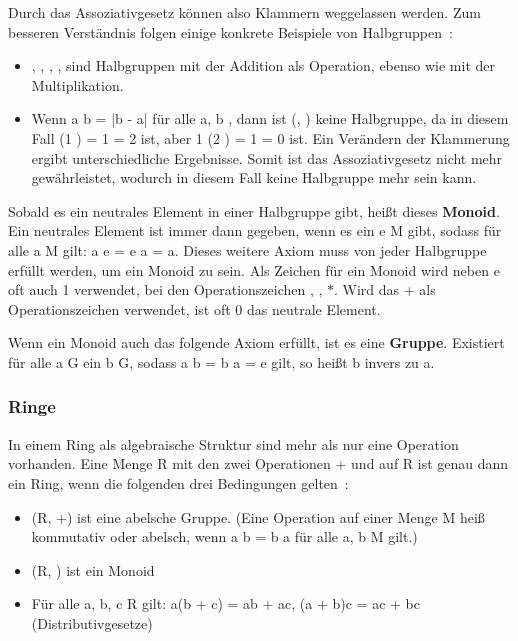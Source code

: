 			Durch das Assoziativgesetz können also Klammern weggelassen werden. Zum besseren Verständnis folgen einige konkrete Beispiele von Halbgruppen~\cite{Erste:Hilfe:in:Linearer:Algebra}:
			
			\begin{itemize}
				\item {}, , , ,  sind Halbgruppen mit der Addition als Operation, ebenso wie mit der Multiplikation.
				\item Wenn a \mycirc b = |b - a| für alle a, b \myin \myMenge{Z}, dann ist (, \mycircOhne) keine Halbgruppe, da in diesem Fall (1 ) \mycirc 3 = 1  = 2 ist, aber 1 \mycirc (2 ) = 1  = 0 ist. Ein Verändern der Klammerung ergibt unterschiedliche Ergebnisse. Somit ist das Assoziativgesetz nicht mehr gewährleistet, wodurch  in diesem Fall keine Halbgruppe mehr sein kann.
			\end{itemize}

			Sobald es ein neutrales Element in einer Halbgruppe gibt, heißt dieses \textbf{Monoid}. Ein neutrales Element ist immer dann gegeben, wenn es ein e \myin M gibt, sodass für alle a \myin M gilt: a \mycirc e = e \mycirc a = a. Dieses weitere Axiom muss von jeder Halbgruppe erfüllt werden, um ein Monoid zu sein. Als Zeichen für ein Monoid wird neben e oft auch 1 verwendet, bei den Operationszeichen \mycircOhne, \mycdotOhne, $*$. Wird das + als Operationszeichen verwendet, ist oft 0 das neutrale Element.~\cite{Erste:Hilfe:in:Linearer:Algebra}

			Wenn ein Monoid auch das folgende Axiom erfüllt, ist es eine \textbf{Gruppe}. Existiert für alle a \myin G ein b \myin G, sodass a \mycirc b = b \mycirc a = e gilt, so heißt b invers zu a.~\cite{Erste:Hilfe:in:Linearer:Algebra}
		
		\subsubsection{Ringe}
			In einem Ring als algebraische Struktur sind mehr als nur eine Operation vorhanden. Eine Menge R mit den zwei Operationen + und \mycdot auf R ist genau dann ein Ring, wenn die folgenden drei Bedingungen gelten~\cite{Erste:Hilfe:in:Linearer:Algebra}:
			
			\begin{itemize}
				\item (R, +) ist eine abelsche Gruppe. (Eine Operation \mycirc auf einer Menge M heiß kommutativ oder abelsch, wenn a \mycirc b = b \mycirc a für alle a, b \myin M gilt.)
				\item (R, \mycdotOhne) ist ein Monoid
				\item Für alle a, b, c \myin R gilt: a(b + c) = ab + ac, (a + b)c = ac + bc (Distributivgesetze)
			\end{itemize}
			
